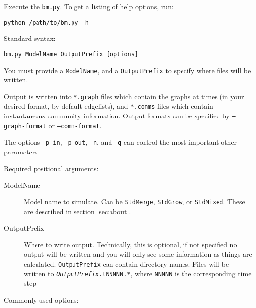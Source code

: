 \documentclass{article}
\def\code#1{\texttt{#1}}
\begin{document}
Execute the \code{bm.py}.  To get a listing of help options, run:

\begin{verbatim}
python /path/to/bm.py -h
\end{verbatim}

Standard syntax:
\begin{verbatim}
bm.py ModelName OutputPrefix [options]
\end{verbatim}
You must provide a \texttt{ModelName}, and a \texttt{OutputPrefix} to
specify where files will be written.

Output is written into \texttt{*.graph} files which contain the graphs
at times (in your desired format, by default edgelists), and
\texttt{*.comms} files which contain instantaneous community
information.  Output formats can be specified by \code{--graph-format}
or \code{--comm-format}.

The options \code{--p\_in}, \code{--p\_out}, \code{--n}, and \code{--q}
can control the most important other parameters.

\vspace{.5cm}

\noindent
Required positional arguments:

\begin{description}
\item[ModelName] Model name to simulate.  Can be \texttt{StdMerge},
  \texttt{StdGrow}, or \texttt{StdMixed}.  These are described
  in section \ref{sec:about}.
\item[OutputPrefix] Where to write output.  Technically, this is
  optional, if not specified no output will be written and you will
  only see some information as things are calculated.
  \texttt{OutputPrefix} can contain directory names.  Files will be
  written to \texttt{\textsl{OutputPrefix}.tNNNNN.*}, where \texttt{NNNNN} is
  the corresponding time step.
\end{description}


\vspace{.5cm}

\noindent
Commonly used options:
\end{document}
